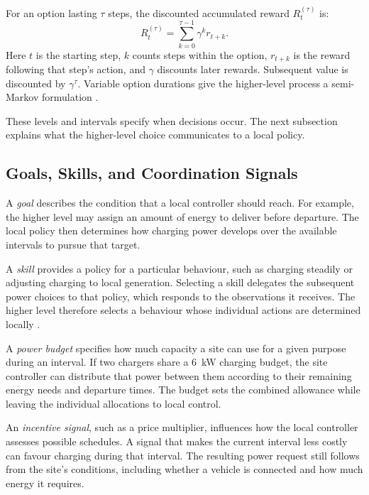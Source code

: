 For an option lasting $\tau$ steps, the discounted accumulated reward $R_t^{(\tau)}$ is:
\begin{equation}
R_t^{(\tau)}=\sum_{k=0}^{\tau-1}\gamma^k r_{t+k}.
\label{eq:ch2-option-reward}
\end{equation}
Here $t$ is the starting step, $k$ counts steps within the option, $r_{t+k}$ is the reward following that step's action, and $\gamma$ discounts later rewards. Subsequent value is discounted by $\gamma^\tau$. Variable option durations give the higher-level process a semi-Markov formulation \parencite{sutton1999options}.

These levels and intervals specify when decisions occur. The next subsection explains what the higher-level choice communicates to a local policy.

\subsection{Goals, Skills, and Coordination Signals}
\label{sec:ch2-hierarchy-signals}

A \emph{goal} describes the condition that a local controller should reach. For example, the higher level may assign an amount of energy to deliver before departure. The local policy then determines how charging power develops over the available intervals to pursue that target.

A \emph{skill} provides a policy for a particular behaviour, such as charging steadily or adjusting charging to local generation. Selecting a skill delegates the subsequent power choices to that policy, which responds to the observations it receives. The higher level therefore selects a behaviour whose individual actions are determined locally \parencite{vezhnevets2017fun,nachum2018hiro}.

A \emph{power budget} specifies how much capacity a site can use for a given purpose during an interval. If two chargers share a 6~kW charging budget, the site controller can distribute that power between them according to their remaining energy needs and departure times. The budget sets the combined allowance while leaving the individual allocations to local control.

An \emph{incentive signal}, such as a price multiplier, influences how the local controller assesses possible schedules. A signal that makes the current interval less costly can favour charging during that interval. The resulting power request still follows from the site's conditions, including whether a vehicle is connected and how much energy it requires.

